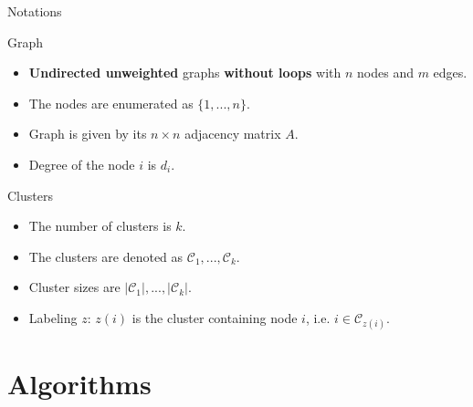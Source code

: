 \documentclass{beamer}
\theoremstyle{definition}
\theoremstyle{plain}
\theoremstyle{remark}
\begin{document}
			\begin{frame}{Notations}

			\vspace{-5pt}
			\begin{block}{Graph}
				\begin{itemize}
					\item \textbf{Undirected unweighted} graphs \textbf{without loops} with $n$ nodes and $m$ edges.
					\item The nodes are enumerated as $\{ 1, ..., n\}$.\\
					\item Graph is given by its $n \times n $ adjacency matrix $A$.
					\item Degree of the node $i$ is $d_i$.
				\end{itemize}

			\end{block}

			\vspace{-5pt}
			\begin{block}{Clusters}
				\begin{itemize}
				\item The number of clusters is $k$.\\
				\item The clusters are denoted as $\mathcal{C}_1, ..., \mathcal{C}_k$.
				\item Cluster sizes are $ |\mathcal{C}_1|, ..., |\mathcal{C}_k|$.
				\item Labeling $z$: $z(i)$ is the cluster containing node $i$, i.e. $i \in \mathcal{C}_{z(i)}$.
				\end{itemize}
			\end{block}
		\end{frame}

	\section{Algorithms}
\end{document}
